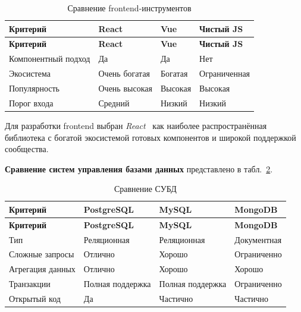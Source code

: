 \begin{longtable}{|p{3cm}|p{3.5cm}|p{3.5cm}|p{3.5cm}|}
	\caption{Сравнение frontend-инструментов}
	\label{tab:frontend} \\

	\hline
	\textbf{Критерий} & \textbf{React} & \textbf{Vue} & \textbf{Чистый JS} \\ \hline
	\endfirsthead

	\tabcont{\ref{tab:frontend}}
	\textbf{Критерий} & \textbf{React} & \textbf{Vue} & \textbf{Чистый JS} \\ \hline
	\endhead

	\hline
	\endfoot

	\hline
	\endlastfoot

	Компонентный подход & Да            & Да           & Нет                \\ \hline
	Экосистема          & Очень богатая & Богатая      & Ограниченная       \\ \hline
	Популярность        & Очень высокая & Высокая      & Высокая            \\ \hline
	Порог входа         & Средний       & Низкий       & Низкий             \\ \hline
\end{longtable}

Для разработки frontend выбран \textit{React}~\cite{react_docs} как наиболее
распространённая библиотека с богатой экосистемой готовых компонентов и
широкой поддержкой сообщества.

\textbf{Сравнение систем управления базами данных} представлено в
табл.~\ref{tab:db}.

\begin{longtable}{|p{3cm}|p{3.5cm}|p{3.5cm}|p{3.5cm}|}
	\caption{Сравнение СУБД}
	\label{tab:db} \\

	\hline
	\textbf{Критерий} & \textbf{PostgreSQL} & \textbf{MySQL} & \textbf{MongoDB} \\ \hline
	\endfirsthead

	\tabcont{\ref{tab:db}}
	\textbf{Критерий} & \textbf{PostgreSQL} & \textbf{MySQL} & \textbf{MongoDB} \\ \hline
	\endhead

	\hline
	\endfoot

	\hline
	\endlastfoot

	Тип                & Реляционная         & Реляционная    & Документная      \\ \hline
	Сложные запросы    & Отлично             & Хорошо         & Ограниченно      \\ \hline
	Агрегация данных   & Отлично             & Хорошо         & Хорошо           \\ \hline
	Транзакции         & Полная поддержка    & Полная поддержка & Ограниченно     \\ \hline
	Открытый код       & Да                  & Частично        & Частично         \\ \hline
\end{longtable}

